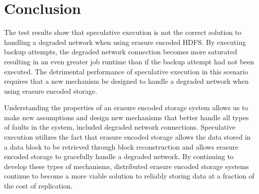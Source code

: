 \documentclass{ucetd}
\begin{document}

\chapter{Conclusion}

The test results show that speculative execution is not the correct solution to
handling a degraded network when using erasure encoded HDFS. By executing backup
attempts, the degraded network connection becomes more saturated resulting in an
even greater job runtime than if the backup attempt had not been executed. The
detrimental performance of speculative execution in this scenario requires that
a new mechanism be designed to handle a degraded network when using erasure
encoded storage.

Understanding the properties of an erasure encoded storage system allows us to
make new assumptions and design new mechanisms that better handle all types of
faults in the system, included degraded network connections. Speculative
execution utilizes the fact that erasure encoded storage allows the data stored
in a data block to be retrieved through block reconstruction and allows erasure
encoded storage to gracefully handle a degraded network.  By continuing to
develop these types of mechanisms, distributed erasure encoded storage systems
continue to become a more viable solution to reliably storing data at a fraction
of the cost of replication.

\end{document}
